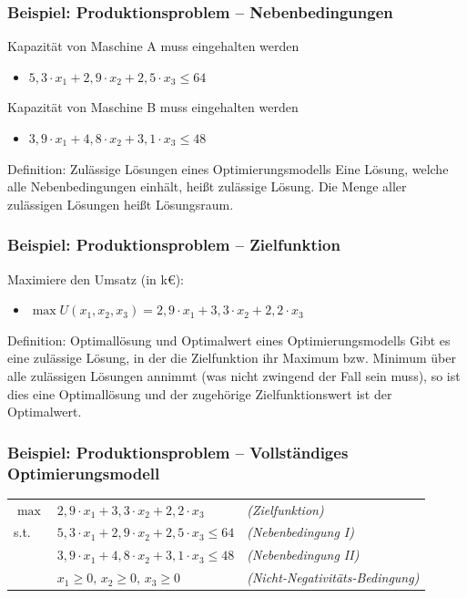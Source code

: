 \begin{frame}
 \frametitle{Beispiel: Produktionsproblem -- Nebenbedingungen}
  
  Kapazität von Maschine A muss eingehalten werden
  \begin{itemize}
   \item $5,3 \cdot x_1 + 2,9 \cdot x_2 + 2,5 \cdot x_3 \leq 64$
  \end{itemize}

  Kapazität von Maschine B muss eingehalten werden
  \begin{itemize}
   \item $3,9 \cdot x_1 + 4,8 \cdot x_2 + 3,1 \cdot x_3 \leq 48$
  \end{itemize}
 
 \begin{block}{Definition: Zulässige Lösungen eines Optimierungsmodells}
  Eine Lösung, welche alle Nebenbedingungen einhält, heißt zulässige Lösung. Die Menge aller zulässigen Lösungen heißt Lösungsraum.
 \end{block}
\end{frame}

\begin{frame}
 \frametitle{Beispiel: Produktionsproblem -- Zielfunktion}
 Maximiere den Umsatz (in k€):
 \begin{itemize}
  \item $\max U(x_1, x_2, x_3) = 2,9\cdot x_1 + 3,3\cdot x_2 + 2,2\cdot x_3$
 \end{itemize}
 
 \begin{block}{Definition: Optimallösung und Optimalwert eines Optimierungsmodells}
  Gibt es eine zulässige Lösung, in der die Zielfunktion ihr Maximum bzw. Minimum über alle zulässigen Lösungen annimmt (was nicht zwingend der Fall sein muss), so ist dies eine Optimallösung und der zugehörige Zielfunktionswert ist der Optimalwert.
 \end{block}
\end{frame}

\begin{frame}\small
 \frametitle{Beispiel: Produktionsproblem -- Vollständiges Optimierungsmodell}
 \begin{tabularx}{\linewidth}{ll@{\quad}>{\itshape\footnotesize}X}
 $\max$ & $2,9\cdot x_1 + 3,3\cdot x_2 + 2,2\cdot x_3$ & (Zielfunktion)\\
 s.t. & $5,3\cdot x_1 + 2,9\cdot x_2 + 2,5\cdot x_3 \leq 64$ & (Nebenbedingung I)\\
      & $3,9\cdot x_1 + 4,8\cdot x_2 + 3,1\cdot x_3 \leq 48$ & (Nebenbedingung II)\\
      & $x_1\geq0,\,x_2\geq0,\,x_3\geq0$ & (Nicht-Negativitäts-Bedingung)\\
\end{tabularx}
\end{frame}




